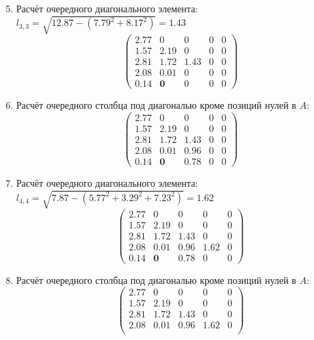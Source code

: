 \begin{multicols}{3}
    \columnbreak
    \begin{enumerate}
    \setcounter{enumi}{4}
    \item Расчёт очередного диагонального элемента: $l_{3,3} = \sqrt{12.87 - (7.79^2+8.17^2)} = 1.43$
    $$\begin{pmatrix}
        2.77 & 0     & 0    & 0 & 0 \\
        1.57 & 2.19  & 0    & 0 & 0 \\
        2.81 & 1.72  & 1.43 & 0 & 0 \\
        2.08 & 0.01  & 0    & 0 & 0 \\
        0.14 &  \mathbf{0}     & 0    & 0 & 0
    \end{pmatrix}$$
    \vspace{-0.5cm}
    \item Расчёт очередного столбца под диагональю кроме позиций нулей в $A$:
    $$\begin{pmatrix}
        2.77 & 0     & 0    & 0 & 0 \\
        1.57 & 2.19  & 0    & 0 & 0 \\
        2.81 & 1.72  & 1.43 & 0 & 0 \\
        2.08 & 0.01  & 0.96 & 0 & 0 \\
        0.14 &  \mathbf{0}     & 0.78 & 0 & 0
    \end{pmatrix}$$
    \vspace{-0.5cm}
    \item Расчёт очередного диагонального элемента: $l_{4,4} = \sqrt{7.87 - (5.77^2+3.29^2+7.23^2)} = 1.62$
    $$\begin{pmatrix}
        2.77 & 0     & 0    & 0    & 0 \\
        1.57 & 2.19  & 0    & 0    & 0 \\
        2.81 & 1.72  & 1.43 & 0    & 0 \\
        2.08 & 0.01  & 0.96 & 1.62 & 0 \\
        0.14 &  \mathbf{0}     & 0.78 & 0    & 0
    \end{pmatrix}$$
    \vspace{-0.5cm}
    \item Расчёт очередного столбца под диагональю кроме позиций нулей в $A$:
    $$\begin{pmatrix}
        2.77 & 0     & 0    & 0    & 0 \\
        1.57 & 2.19  & 0    & 0    & 0 \\
        2.81 & 1.72  & 1.43 & 0    & 0 \\
        2.08 & 0.01  & 0.96 & 1.62 & 0 \\

\end{pmatrix}$$
\end{enumerate}
\end{multicols}
